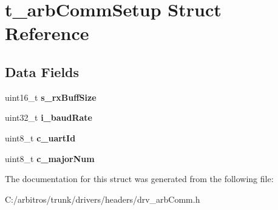 \hypertarget{structt__arb_comm_setup}{\section{t\-\_\-arb\-Comm\-Setup Struct Reference}
\label{structt__arb_comm_setup}
}
\subsection*{Data Fields}
\begin{DoxyCompactItemize}
\item 
\hypertarget{structt__arb_comm_setup_ad3c09231d7c012199f3501b37686d955}{uint16\-\_\-t {\bfseries s\-\_\-rx\-Buff\-Size}}\label{structt__arb_comm_setup_ad3c09231d7c012199f3501b37686d955}

\item 
\hypertarget{structt__arb_comm_setup_ac316d01a82a05edc681fdfe0bac24060}{uint32\-\_\-t {\bfseries i\-\_\-baud\-Rate}}\label{structt__arb_comm_setup_ac316d01a82a05edc681fdfe0bac24060}

\item 
\hypertarget{structt__arb_comm_setup_a40f57779b05162e1cea2635c18c6dad9}{uint8\-\_\-t {\bfseries c\-\_\-uart\-Id}}\label{structt__arb_comm_setup_a40f57779b05162e1cea2635c18c6dad9}

\item 
\hypertarget{structt__arb_comm_setup_afba9106eb2fa769623759a1b529f884e}{uint8\-\_\-t {\bfseries c\-\_\-major\-Num}}\label{structt__arb_comm_setup_afba9106eb2fa769623759a1b529f884e}

\end{DoxyCompactItemize}


The documentation for this struct was generated from the following file\-:\begin{DoxyCompactItemize}
\item 
C\-:/arbitros/trunk/drivers/headers/drv\-\_\-arb\-Comm.\-h\end{DoxyCompactItemize}
